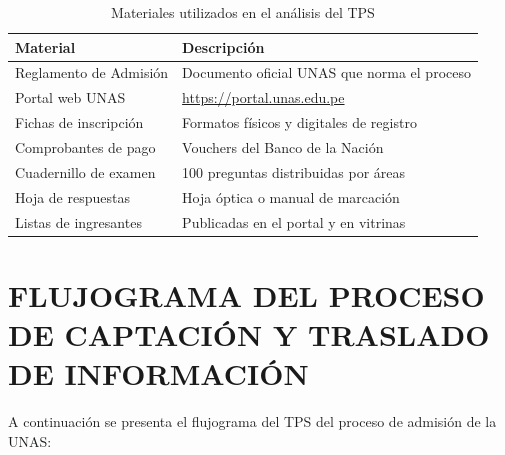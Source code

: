 \documentclass[12pt, a4paper]{report}
\begin{document}
\begin{table}[H]
  \centering
  \caption{Materiales utilizados en el análisis del TPS}
  \label{tab:materiales}
  \begin{tabular}{p{4cm} p{8cm}}
    \toprule
    \textbf{Material} & \textbf{Descripción} \\
    \midrule
    Reglamento de Admisión & Documento oficial UNAS que norma el proceso \\
    Portal web UNAS & \url{https://portal.unas.edu.pe} \\
    Fichas de inscripción & Formatos físicos y digitales de registro \\
    Comprobantes de pago & Vouchers del Banco de la Nación \\
    Cuadernillo de examen & 100 preguntas distribuidas por áreas \\
    Hoja de respuestas & Hoja óptica o manual de marcación \\
    Listas de ingresantes & Publicadas en el portal y en vitrinas \\
    \bottomrule
  \end{tabular}
\end{table}

\section{FLUJOGRAMA DEL PROCESO DE CAPTACIÓN Y TRASLADO DE INFORMACIÓN}

A continuación se presenta el flujograma del TPS del proceso de admisión de la UNAS:
\end{document}
